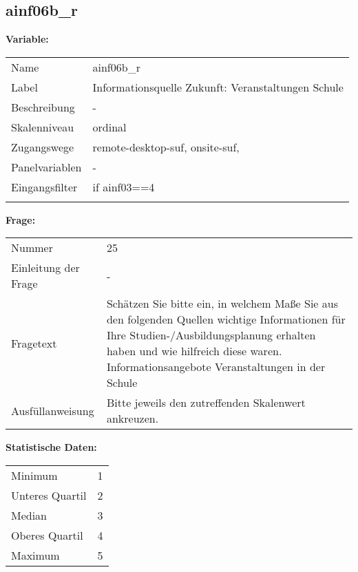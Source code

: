 	
	
	\subsection{ainf06b\_r}
	\label{subSection:ainf06b_r}

	\noindent\textbf{Variable:}\\
		\begin{tabular}{lL{11.3cm}}
			\label{tableVariable:ainf06b_r}
			Name & ainf06b\_r \\
			Label & Informationsquelle Zukunft: Veranstaltungen Schule \\
			Beschreibung & - \\
			Skalenniveau & ordinal \\
			Zugangswege &
				remote-desktop-suf,
				onsite-suf,
 \\
			Panelvariablen & -
			 \\
			Eingangsfilter & if ainf03==4 \\
 \\
		\end{tabular}

		\vspace*{1 cm}
		\noindent\textbf{Frage:}\\
		\begin{tabular}{lL{11.3cm}}
			\label{tableQuestion:ainf06b_r}
			Nummer & 25 \\
			Einleitung der Frage & - \\
			Fragetext & Schätzen Sie bitte ein, in welchem Maße Sie aus den folgenden Quellen wichtige Informationen für Ihre Studien-/Ausbildungsplanung erhalten haben und wie hilfreich diese waren.
Informationsangebote
Veranstaltungen in der Schule \\
			Ausfüllanweisung & Bitte jeweils den zutreffenden Skalenwert ankreuzen. \\
		\end{tabular}


		\vspace*{1 cm}
		\noindent\textbf{Statistische Daten:}\\
			\begin{tabular}{ll}
				\label{tableStatistics:ainf06b_r}
					Minimum & 1 \\
					Unteres Quartil & 2 \\
					Median & 3 \\
					Oberes Quartil & 4 \\
					Maximum & 5 \\
			\end{tabular}



